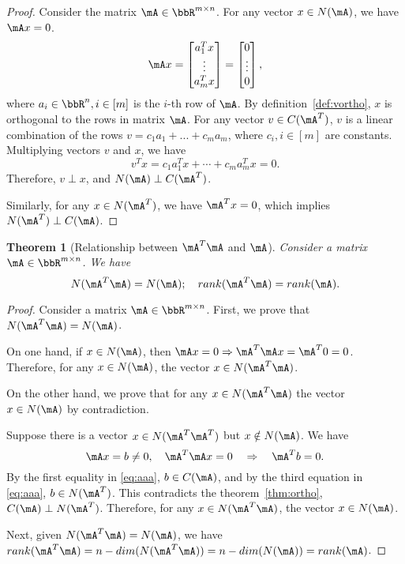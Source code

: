 \documentclass[11pt]{article}
\theoremstyle{plain}
\newtheorem{thm}{Theorem}[section]
\theoremstyle{definition}
\begin{document}
\begin{proof}
	Consider the matrix $\mA \in \bbR^{m \times n}$. For any vector $x \in N(\mA)$, we have $\mA x = 0$. 
	\begin{align}
		\mA x  = \begin{bmatrix}
			a_1^T x \\ \vdots \\ a_m^T x 
		\end{bmatrix} = \begin{bmatrix}
			0\\ \vdots \\0
		\end{bmatrix},
	\end{align}
	where $a_i \in \bbR^n, i \in [m]$ is the $i$-th  row of $\mA$. By definition~\ref{def:vortho}, $x$ is orthogonal to the rows in matrix $\mA$. For any vector $v \in C(\mA^T)$, $v$ is a linear combination of the rows $v = c_1 a_1 + ...+c_m a_m$, where $c_i, i\in [m]$ are constants. Multiplying vectors $v$ and $x$, we have
	\[  v^T x =  c_1 a_1^T x + \cdots + c_m a_m^T x = 0.  \]
	Therefore, $v \perp x$, and $N(\mA) \perp C(\mA^T)$.
	
	Similarly, for any $x \in N(\mA^T)$, we have $\mA^T x = 0$, which implies $N(\mA^T) \perp C(\mA)$. 
\end{proof}

\begin{thm}[Relationship between $\mA^T \mA$ and $\mA$]\label{thm:aa}
	Consider a matrix $\mA \in \bbR^{m \times n}$. We have
	\begin{equation}
		N(\mA^T \mA) = N(\mA) ; \quad rank(\mA^T \mA) = rank(\mA).
	\end{equation}
\end{thm}
\begin{proof}
	Consider a matrix $\mA \in \bbR^{m \times n}$. First, we prove that $N(\mA^T \mA) = N(\mA)$.
	
	On one hand, if $x \in N(\mA)$, then $\mA x = 0 \Rightarrow \mA^T  \mA x = \mA^T 0 = 0$. Therefore, for any $x \in N(\mA)$, the vector $x \in N(\mA^T \mA)$. 
	
	
	On the other hand, we  prove that for any $x \in N(\mA^T \mA)$ the vector $x \in N(\mA)$ by contradiction.
	
	Suppose there is a vector $x \in N(\mA^T \mA^T)$ but $x \notin N(\mA)$. We have
	\begin{equation}\label{eq:aaa}
		\mA x = b \neq 0, \quad \mA^T \mA x = 0 \quad \Rightarrow \quad \mA^T b = 0.
	\end{equation} 
	By the first equality in \eqref{eq:aaa}, $b \in C(\mA)$, and by the third equation in \eqref{eq:aaa}, $ b \in N(\mA^T)$. This contradicts the theorem~\ref{thm:ortho}, $C(\mA) \perp N(\mA^T)$. Therefore, for any $x \in N(\mA^T \mA)$, the vector $x \in N(\mA)$.
	
	Next, given $N(\mA^T \mA) = N(\mA)$, we have $rank(\mA^T \mA) = n - dim(N(\mA^T \mA)) = n - dim(N(\mA)) = rank(\mA)$.
\end{proof}
\end{document}
